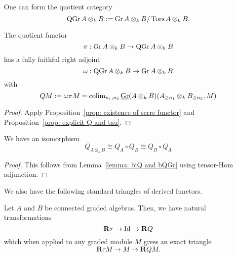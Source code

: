 One can form the quotient category
\begin{displaymath}
  \operatorname{QGr}A \otimes_k B := \operatorname{Gr}A \otimes_k B / \operatorname{Tors}A \otimes_k B.
\end{displaymath}

\begin{lemma} \label{lemma: biQ and bQGr}
  The quotient functor 
  \begin{displaymath}
    \pi : \operatorname{Gr}A \otimes_k B \to \operatorname{QGr}A \otimes_k B
  \end{displaymath}
  has a fully faithful right adjoint 
  \begin{displaymath}
    \omega : \operatorname{QGr}A \otimes_k B \to \operatorname{Gr}A \otimes_k B
  \end{displaymath}
  with 
  \begin{displaymath}
    QM := \omega \pi M = \operatorname{colim}_{n_1,n_2} \underline{\operatorname{Gr}}(A \otimes_k B)( A_{\geq n_1} \otimes_k B_{\geq n_2} , M)
  \end{displaymath}
\end{lemma}

\begin{proof}
  Apply Proposition~\ref{prop: existence of serre functor} and Proposition~\ref{prop: explicit Q and tau}.
\end{proof}

\begin{corollary}\label{corollary: relation on Qs}
  We have an isomorphism 
  \begin{displaymath}
    Q_{A \otimes_k B} \cong Q_A \circ Q_B \cong Q_B \circ Q_A
  \end{displaymath}
\end{corollary}

\begin{proof}
  This follows from Lemma~\ref{lemma: biQ and bQGr} using tensor-Hom adjunction. 
\end{proof}

We also have the following standard triangles of derived functors. 

\begin{lemma} \label{lemma: exact triangles}
  Let \(A\) and \(B\) be connected graded algebras. Then, we have natural transformations 
  \begin{displaymath}
    \mathbf{R} \tau \to \operatorname{Id} \to \mathbf{R} Q 
  \end{displaymath}
  which when applied to any graded module \(M\) gives an exact triangle 
  \begin{displaymath}
    \mathbf{R} \tau M \to M \to \mathbf{R} Q M.
  \end{displaymath}
\end{lemma}


